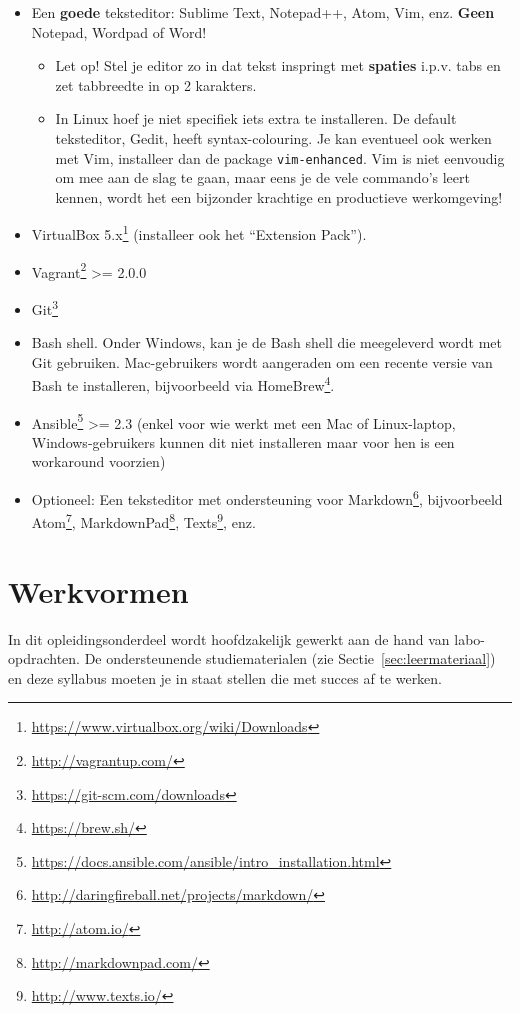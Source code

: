 \begin{itemize}
  \item Een \textbf{goede} teksteditor: Sublime Text, Notepad++, Atom, Vim, enz. \textbf{Geen} Notepad, Wordpad of Word!
  \begin{itemize}
    \item Let op! Stel je editor zo in dat tekst inspringt met \textbf{spaties} i.p.v. tabs en zet tabbreedte in op 2 karakters.
    \item In Linux hoef je niet specifiek iets extra te installeren. De default teksteditor, Gedit, heeft syntax-colouring. Je kan eventueel ook werken met Vim, installeer dan de package \texttt{vim-enhanced}. Vim is niet eenvoudig om mee aan de slag te gaan, maar eens je de vele commando's leert kennen, wordt het een bijzonder krachtige en productieve werkomgeving!
  \end{itemize}
  \item VirtualBox 5.x\footnote{\url{https://www.virtualbox.org/wiki/Downloads}} (installeer ook het ``Extension Pack'').
  \item Vagrant\footnote{\url{http://vagrantup.com/}} \textgreater{}= 2.0.0
  \item Git\footnote{\url{https://git-scm.com/downloads}}
  \item Bash shell. Onder Windows, kan je de Bash shell die meegeleverd wordt met Git gebruiken. Mac-gebruikers wordt aangeraden om een recente versie van Bash te installeren, bijvoorbeeld via HomeBrew\footnote{\url{https://brew.sh/}}.
  \item Ansible\footnote{\url{https://docs.ansible.com/ansible/intro_installation.html}} \textgreater{}= 2.3 (enkel voor wie werkt met een Mac of Linux-laptop, Windows-gebruikers kunnen dit niet installeren maar voor hen is een workaround voorzien)
  \item Optioneel: Een teksteditor met ondersteuning voor Markdown\footnote{\url{http://daringfireball.net/projects/markdown/}}, bijvoorbeeld Atom\footnote{\url{http://atom.io/}}, MarkdownPad\footnote{\url{http://markdownpad.com/}}, Texts\footnote{\url{http://www.texts.io/}}, enz.
\end{itemize}

\section{Werkvormen}
\label{sec:werkvormen}

In dit opleidingsonderdeel wordt hoofdzakelijk gewerkt aan de hand van labo-opdrachten. De ondersteunende studiematerialen (zie Sectie~\ref{sec:leermateriaal}) en deze syllabus moeten je in staat stellen die met succes af te werken.

